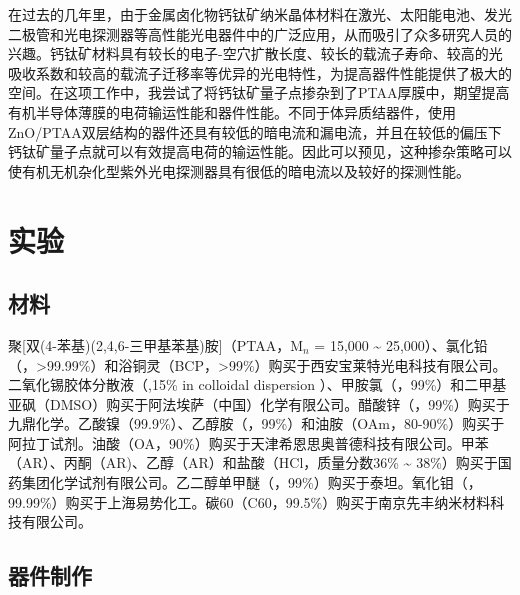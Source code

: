 \documentclass[forlib]{WHUMaster}   %
\begin{document}
{在过去的几年里，由于金属卤化物钙钛矿纳米晶体材料在激光、太阳能电池、发光二极管和光电探测器等高性能光电器件中的广泛应用，从而吸引了众多研究人员的兴趣。钙钛矿材料具有较长的电子-空穴扩散长度、较长的载流子寿命、较高的光吸收系数和较高的载流子迁移率等优异的光电特性，为提高器件性能提供了极大的空间\cite{RN21,RN22,RN40}。在这项工作中，我尝试了将钙钛矿量子点掺杂到了PTAA厚膜中，期望提高有机半导体薄膜的电荷输运性能和器件性能。不同于体异质结器件，使用ZnO/PTAA双层结构的器件还具有较低的暗电流和漏电流，并且在较低的偏压下钙钛矿量子点就可以有效提高电荷的输运性能。因此可以预见，这种掺杂策略可以使有机无机杂化型紫外光电探测器具有很低的暗电流以及较好的探测性能。\vspace{-2mm}

\section{实验}

\subsection{材料}

聚[双(4-苯基)(2,4,6-三甲基苯基)胺]（PTAA，M$_n$ = 15,000 \~{} 25,000）、氯化铅（，>99.99\%）和浴铜灵（BCP，>99\%）购买于西安宝莱特光电科技有限公司。二氧化锡胶体分散液（,15\% in  colloidal dispersion ）、甲胺氯（，99\%）和二甲基亚砜（DMSO）购买于阿法埃萨（中国）化学有限公司。醋酸锌（，99\%）购买于九鼎化学。乙酸镍（99.9\%）、乙醇胺（，99\%）和油胺（OAm，80-90\%）购买于阿拉丁试剂。\iffalse 醋酸镍四水合物（\ce{C4H14NiO8}，AR，99\%）和\fi 油酸（OA，90\%）购买于天津希恩思奥普德科技有限公司。甲苯（AR）、丙酮（AR)、乙醇（AR）和盐酸（HCl，质量分数36\% \~{} 38\%）购买于国药集团化学试剂有限公司。乙二醇单甲醚（，99\%）购买于泰坦。氧化钼（，99.99\%）购买于上海易势化工。碳60（C60，99.5\%）购买于南京先丰纳米材料科技有限公司。

\subsection{器件制作}

}
\end{document}
